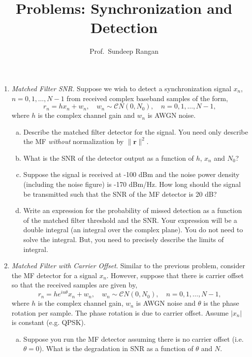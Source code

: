 \documentclass[11pt]{article}
\newcommand{\rbf}{\mathbf{r}}
\begin{document}
\title{Problems:  Synchronization and Detection}
\author{Prof.\ Sundeep Rangan}
\date{}

\maketitle

\begin{enumerate}

\item \emph{Matched Filter SNR.}
Suppose we wish to detect a synchronization signal $x_n$, $n=0,1,\ldots,N-1$ from
received complex baseband samples of the form,
\[
    r_n = hx_n + w_n, \quad w_n \sim {\mathcal CN}(0,N_0),
    \quad n=0,1,\ldots,N-1,
\]
where $h$ is the complex channel gain and $w_n$ is AWGN noise.
\begin{enumerate}[(a)]
\item Describe the matched filter detector for the signal.
You need only describe the MF \emph{without} normalization by $\|\rbf\|^2$.
\item What is the SNR of the detector output as a function of $h$,
$x_n$ and $N_0$?
\item Suppose the signal is received at -100 dBm and the noise
power density (including the noise figure) is -170 dBm/Hz.
How long should the signal be transmitted such that the SNR of the MF
detector is 20 dB?
\item Write an expression for the probability of missed detection
as a function of the matched filter threshold and the SNR.
Your expression will be a double integral (an integral over the complex
plane).  You do not need to solve the integral.  But, you need to precisely
describe the limits of integral.
\end{enumerate}

\item \emph{Matched Filter with Carrier Offset}.
Similar to the previous problem, consider the MF detector for a
signal $x_n$.  However, suppose that there is carrier offset
so that the received samples are given by,
\[
    r_n = he^{in\theta}x_n + w_n, \quad w_n \sim {\mathcal CN}(0,N_0),
    \quad n=0,1,\ldots,N-1,
\]
where $h$ is the complex channel gain, $w_n$ is AWGN noise
and $\theta$ is the phase rotation per sample.
The phase rotation is due to carrier offset.
Assume $|x_n|$ is constant (e.g. QPSK).
\begin{enumerate}[(a)]
\item Suppose you run the MF detector assuming
there is no carrier offset (i.e.\ $\theta=0$).  What is the degradation in
SNR as a function of $\theta$ and $N$.


\end{enumerate}
\end{enumerate}
\end{document}
